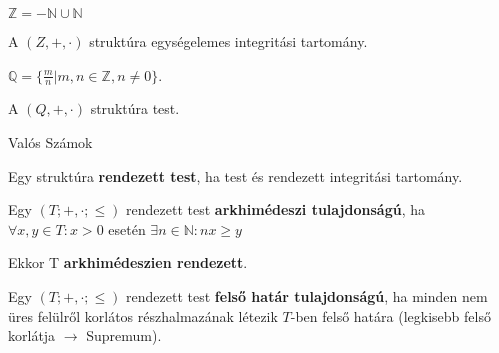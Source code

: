 \begin{frame}
\begin{tcolorbox}[title={Def.: Egész számok}]
  $\mathbb{Z} = -\mathbb{N} \cup \mathbb{N}$
\end{tcolorbox}

\begin{tcolorbox}[title={Ész}]
  A $(Z, +, {\cdot})$ struktúra egységelemes integritási tartomány.
\end{tcolorbox}

\begin{tcolorbox}[title={Def.: Racionális számok}]
  $\mathbb{Q} = \{\frac{m}{n} | m,n \in \mathbb{Z}, n \neq 0 \}$.
\end{tcolorbox}

\begin{tcolorbox}[title={Ész}]
  A $(Q, +, {\cdot})$ struktúra test.
\end{tcolorbox}
\end{frame}

\begin{frame}
\begin{tcolorbox}
{\Huge Valós Számok}
\end{tcolorbox}
\end{frame}

\begin{frame}
\begin{tcolorbox}[title={Def.: Rendezett test}]
  Egy struktúra \textbf{rendezett test}, ha test és rendezett integritási tartomány.
\end{tcolorbox}

\begin{tcolorbox}[title={Def.: Arkhimédészi tulajdonság}]
  Egy $(T; +, {\cdot}; {\leq})$ rendezett test \textbf{arkhimédeszi tulajdonságú}, ha\\
  ${\forall}x, y \in T : x > 0$ esetén ${\exists}n \in \mathbb{N} : nx \geq y$\\
  \msmallskip
  
  Ekkor T \textbf{arkhimédeszien rendezett}.
\end{tcolorbox}

\begin{tcolorbox}[title={Def.: Felső határ tulajdonság}]
  Egy $(T; +, {\cdot}; {\leq})$ rendezett test \textbf{felső határ tulajdonságú}, ha minden nem üres felülről korlátos részhalmazának létezik $T$-ben felső határa (legkisebb felső korlátja $\rightarrow$ Supremum).
\end{tcolorbox}
\end{frame}

